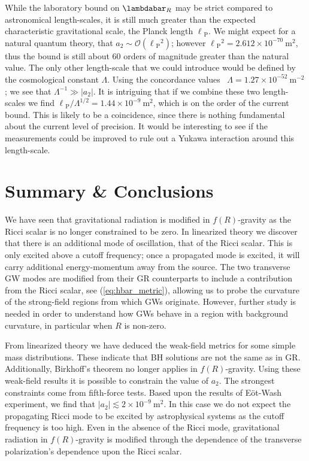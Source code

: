 \documentclass[aps,prd,amsfonts,amssymb,amsmath,nofootinbib,reprint,showpacs]{revtex4-1}
\newcommand{\eqnref}[1]{(\ref{eq:#1})}
\newcommand{\units}[1]{\ensuremath{~\mathrm{#1}}}
\newcommand{\sub}[1]{\ensuremath{_\text{#1}}}
\newcommand{\order}[1]{\ensuremath{\mathcal{O}({#1})}}
\begin{document}
While the laboratory bound on $\lambdabar_R$ may be strict compared to astronomical length-scales, it is still much greater than the expected characteristic gravitational scale, the Planck length $\ell\sub{P}$. We might expect for a natural quantum theory, that $a_2 \sim \order{\ell\sub{P}^2}$; however $\ell\sub{P}^2 = 2.612 \times 10^{-70}\units{m^2}$, thus the bound is still about $60$ orders of magnitude greater than the natural value. The only other length-scale that we could introduce would be defined by the cosmological constant $\Lambda$. Using the concordance values~\cite{Hinshaw2009} $\Lambda = 1.27 \times 10^{-52}\units{m^{-2}}$; we see that $\Lambda^{-1} \gg |a_2|$. It is intriguing that if we combine these two length-scales we find ${\ell\sub{P}}/{\Lambda^{1/2}} = 1.44 \times 10^{-9}\units{m^2}$, which is on the order of the current bound. This is likely to be a coincidence, since there is nothing fundamental about the current level of precision. It would be interesting to see if the measurements could be improved to rule out a Yukawa interaction around this length-scale.

\section{Summary \& Conclusions\label{sec:f_Discuss}}

We have seen that gravitational radiation is modified in $f(R)$-gravity as the Ricci scalar is no longer constrained to be zero. In linearized theory we discover that there is an additional mode of oscillation, that of the Ricci scalar. This is only excited above a cutoff frequency; once a propagated mode is excited, it will carry additional energy-momentum away from the source. The two transverse GW modes are modified from their GR counterparts to include a contribution from the Ricci scalar, see \eqnref{hbar_metric}, allowing us to probe the curvature of the strong-field regions from which GWs originate. However, further study is needed in order to understand how GWs behave in a region with background curvature, in particular when $R$ is non-zero.

From linearized theory we have deduced the weak-field metrics for some simple mass distributions. These indicate that BH solutions are not the same as in GR. Additionally, Birkhoff's theorem no longer applies in $f(R)$-gravity. Using these weak-field results it is possible to constrain the value of $a_2$. The strongest constraints come from fifth-force tests. Based upon the results of E\"ot-Wash experiment, we find that $|a_2| \lesssim 2 \times 10^{-9}\units{m^2}$. In this case we do not expect the propagating Ricci mode to be excited by astrophysical systems as the cutoff frequency is too high. Even in the absence of the Ricci mode, gravitational radiation in $f(R)$-gravity is modified through the dependence of the transverse polarization's dependence upon the Ricci scalar.
\end{document}

